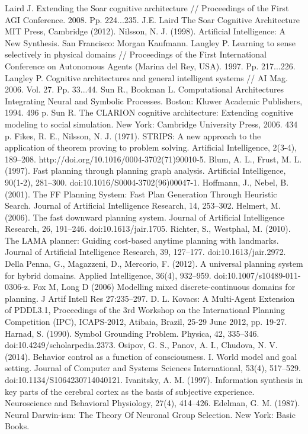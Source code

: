 \documentclass[runningheads,a4paper]{llncs}
\begin{document}
\begin{thebibliography}{4}
 Laird J. Extending the Soar cognitive architecture // Proceedings of the First AGI Conference. 2008. Pp. 224...235.
 J.E. Laird The Soar Cognitive Architecture MIT Press, Cambridge (2012).
 Nilsson, N. J. (1998). Artificial Intelligence: A New Synthesis. San Francisco: Morgan Kaufmann.
 Langley P. Learning to sense selectively in physical domains // Proceedings of the First International Conference on Autonomous Agents (Marina del Rey, USA). 1997. Pp. 217...226.
 Langley P. Cognitive architectures and general intelligent systems // AI Mag. 2006. Vol. 27. Pp.  33...44.
 Sun R., Bookman L. Computational Architectures Integrating Neural and Symbolic Processes. Boston: Kluwer Academic Publishers, 1994. 496 p.
 Sun R. The CLARION cognitive architecture: Extending cognitive modeling to social simulation. New York: Cambridge University Press, 2006. 434 p.
 Fikes, R. E., Nilsson, N. J. (1971). STRIPS: A new approach to the application of theorem proving to problem solving. Artificial Intelligence, 2(3-4), 189--208. http://doi.org/10.1016/0004-3702(71)90010-5.
 Blum, A. L., Frust, M. L. (1997). Fast planning through planning graph analysis. Artificial Intelligence, 90(1-2), 281--300. doi:10.1016/S0004-3702(96)00047-1.
 Hoffmann, J., Nebel, B. (2001). The FF Planning System: Fast Plan Generation Through Heuristic Search. Journal of Artificial Intelligence Research, 14, 253--302.
 Helmert, M. (2006). The fast downward planning system. Journal of Artificial Intelligence Research, 26, 191--246. doi:10.1613/jair.1705.
 Richter, S., Westphal, M. (2010). The LAMA planner: Guiding cost-based anytime planning with landmarks. Journal of Artificial Intelligence Research, 39, 127--177. doi:10.1613/jair.2972.
 Della Penna, G., Magazzeni, D., Mercorio, F. (2012). A universal planning system for hybrid domains. Applied Intelligence, 36(4), 932--959. doi:10.1007/s10489-011-0306-z.
 Fox M, Long D (2006) Modelling mixed discrete-continuous domains for planning. J Artif Intell Res 27:235--297.
 D. L. Kovacs: A Multi-Agent Extension of PDDL3.1, Proceedings of the 3rd Workshop on the International Planning Competition (IPC), ICAPS-2012, Atibaia, Brazil, 25-29 June 2012, pp. 19-27.
 Harnad, S. (1990). Symbol Grounding Problem. Physica, 42, 335--346. doi:10.4249/scholarpedia.2373.
 Osipov, G. S., Panov, A. I., Chudova, N. V. (2014). Behavior control as a function of consciousness. I. World model and goal setting. Journal of Computer and Systems Sciences International, 53(4), 517--529. doi:10.1134/S1064230714040121.
 Ivanitsky, A. M. (1997). Information synthesis in key parts of the cerebral cortex as the basis of subjective experience. Neuroscience and Behavioral Physiology, 27(4), 414--426.
 Edelman, G. M. (1987). Neural Darwin-ism: The Theory Of Neuronal Group Selection. New York: Basic Books.


\end{thebibliography}
\end{document}
